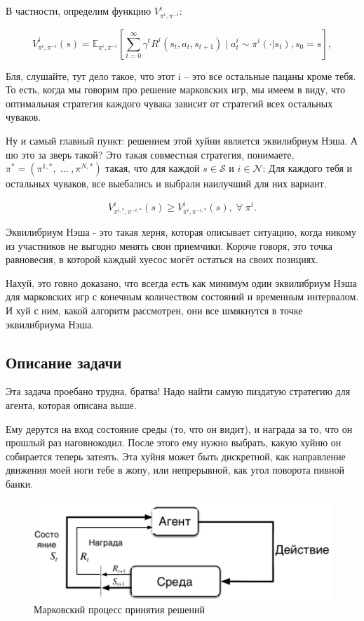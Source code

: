 В частности, определим функцию \( V^i_{\pi^i, \pi^{-i}} \):

\begin{equation}
	V^i_{\pi^i, \pi^{-i}}(s) = \mathbb{E}_{\pi^i, \pi^{-i}} \left[ \sum_{t=0}^{\infty} \gamma^t R^i(s_t, a_t, s_{t+1}) \mid a^i_t \sim \pi^i(\cdot|s_t), s_0=s \right],
\end{equation}

Бля, слушайте, тут дело такое, что этот i – это все остальные пацаны кроме тебя. То есть, когда мы говорим про решение марковских игр, мы имеем в виду, что оптимальная стратегия каждого чувака зависит от стратегий всех остальных чуваков.

Ну и самый главный пункт: решением этой хуйни является эквилибриум Нэша. А шо это за зверь такой? Это такая совместная стратегия, понимаете, \(\pi^*=(\pi^{1,*}, \; \dots \;, \pi^{N, *})\) такая, что для каждой \(s \in \mathcal{S}\) и  \(i \in \mathcal{N}\):
Для каждого тебя и остальных чуваков, все выебались и выбрали наилучший для них вариант.


\begin{equation}
	V^i_{\pi^{i, *}, \pi^{-i, *}}(s) \geq  V^i_{\pi^i, \pi^{-i, *}}(s), \; \forall  \; \pi^i.
\end{equation}

Эквилибриум Нэша - это такая херня, которая описывает ситуацию, когда никому из участников не выгодно менять свои приемчики. Короче говоря, это точка равновесия, в которой каждый хуесос могёт остаться на своих позициях.

Нахуй, это говно доказано, что всегда есть как минимум один эквилибриум Нэша для марковских игр с конечным количеством состояний и временным интервалом. И хуй с ним, какой алгоритм рассмотрен, они все шмякнутся в точке эквилибриума Нэша. 

\subsection{Описание задачи}

Эта задача проебано трудна, братва! Надо найти самую пиздатую стратегию для агента, которая описана выше.

Ему дерутся на вход состояние среды (то, что он видит), и награда за то, что он прошлый раз наговнокодил.
После этого ему нужно выбрать, какую хуйню он собирается теперь затеять.
Эта хуйня может быть дискретной, как направление движения моей ноги тебе в жопу, или непрерывной, как угол поворота пивной банки.
\begin{figure}[H]
	\label{fig:mdp}
	\includegraphics[width=\textwidth]{./inc/img/mdp.png}
	\caption{Марковский процесс принятия решений}
\end{figure}

